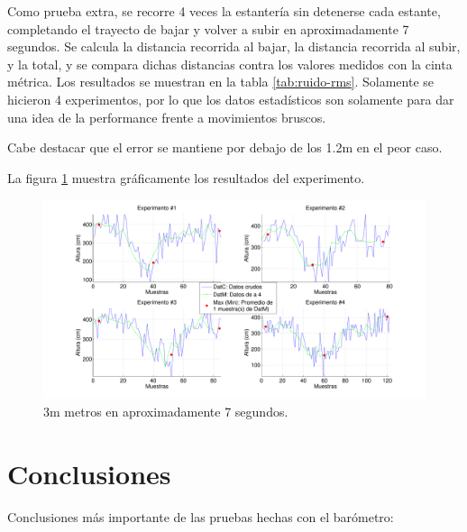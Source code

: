\documentclass[main]{subfiles}
\begin{document}
Como prueba extra, se recorre 4 veces la estanter\'ia sin detenerse cada estante, completando el trayecto de bajar y volver a subir en aproximadamente 7 segundos. Se calcula la distancia recorrida al bajar, la distancia recorrida al subir, y la total, y se compara dichas distancias contra los valores medidos con la cinta m\'etrica. Los resultados se muestran en la tabla \ref{tab:ruido-rms}. Solamente se hicieron 4 experimentos, por lo que los datos estad\'isticos son solamente para dar una idea de la performance frente a movimientos bruscos.

Cabe destacar que el error se mantiene por debajo de los 1.2m en el peor caso.

La figura \ref{fig:estante_veloz.pdf} muestra gr\'aficamente los resultados del experimento.

\begin{figure}[H]
\hspace{-25pt}
  \includegraphics[width=1.1\textwidth]{./pics_barom/estante_veloz.pdf}
  \caption{3m metros en aproximadamente 7 segundos.}
  \label{fig:estante_veloz.pdf}
\end{figure}

\section{Conclusiones}
\label{sec:conclusiones}

Conclusiones m\'as importante de las pruebas hechas con el bar\'ometro:
\end{document}
